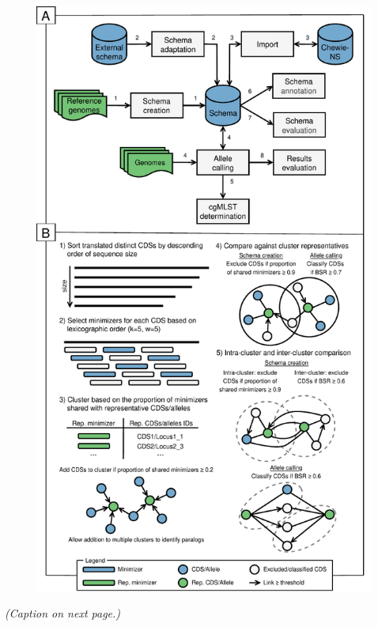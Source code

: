 \begin{figure}[!ht]
    \centering
    \includegraphics[angle=0,height=0.92\textheight]{figures/chapter 2/Figure1.pdf}
    \label{fig:chap2_figure1}
\end{figure}
\vspace*{-6mm}
\begin{center}
    \emph{(Caption on next page.)}
\end{center}
